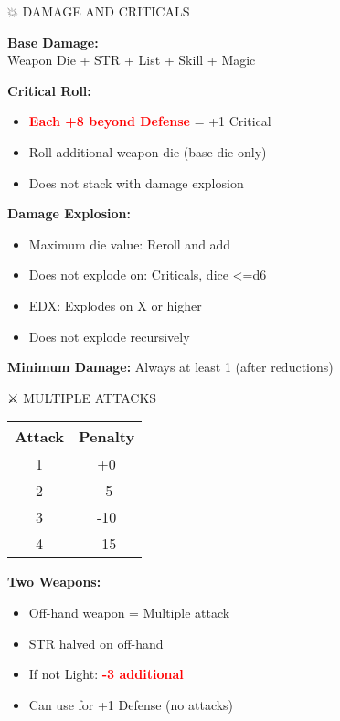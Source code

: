 \documentclass[10pt,a4paper,landscape]{article}
\newcommand{\critical}[1]{\textcolor{red}{\textbf{#1}}}
\begin{document}
\begin{multicols}{4}
		\begin{mainsection}{💥 DAMAGE AND CRITICALS}
			\begin{formula}
				\textbf{Base Damage:}\\
				Weapon Die + STR + List + Skill + Magic
			\end{formula}
			
			\textbf{Critical Roll:}
			\begin{itemize}[noitemsep,leftmargin=8pt]
				\item \critical{Each +8 beyond Defense} = +1 Critical
				\item Roll additional weapon die (base die only)
				\item Does not stack with damage explosion
			\end{itemize}
			
			\textbf{Damage Explosion:}
			\begin{itemize}[noitemsep,leftmargin=8pt]
				\item Maximum die value: Reroll and add
				\item Does not explode on: Criticals, dice <=d6
				\item EDX: Explodes on X or higher
				\item Does not explode recursively
			\end{itemize}
			
			\textbf{Minimum Damage:} Always at least 1 (after reductions)
		\end{mainsection}
		
		\begin{mainsection}{⚔️ MULTIPLE ATTACKS}
			\begin{tabular}{@{}cc@{}}
				\toprule
				\textbf{Attack} & \textbf{Penalty} \\
				\midrule
				1 & +0 \\
				2 & -5 \\
				3 & -10 \\
				4 & -15 \\
				\bottomrule
			\end{tabular}
			
			\textbf{Two Weapons:}
			\begin{itemize}[noitemsep,leftmargin=8pt]
				\item Off-hand weapon = Multiple attack
				\item STR halved on off-hand
				\item If not Light: \critical{-3 additional}
				\item Can use for +1 Defense (no attacks)
			\end{itemize}
			

\end{mainsection}
\end{multicols}
\end{document}
